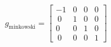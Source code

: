 \documentclass[preview]{standalone}
\begin{document}
\begin{align*}
g_\text{minkowski} = \begin{bmatrix} -1 & 0 & 0 & 0 \\ \
                0 & 1 & 0 & 0 \\ 0 & 0 & 1 & 0 \\ \
                0 & 0 & 0 & 1 \end{bmatrix}
\end{align*}
\end{document}
